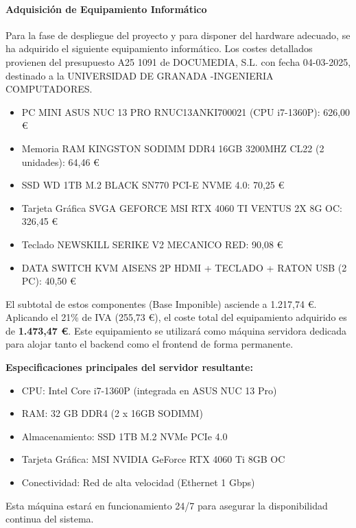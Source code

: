 \paragraph{Adquisición de Equipamiento Informático}
Para la fase de despliegue del proyecto y para disponer del hardware adecuado, se ha adquirido el siguiente equipamiento informático. Los costes detallados provienen del presupuesto A25 1091 de DOCUMEDIA, S.L. con fecha 04-03-2025, destinado a la UNIVERSIDAD DE GRANADA -INGENIERIA COMPUTADORES.
\begin{itemize}
    \item PC MINI ASUS NUC 13 PRO RNUC13ANKI700021 (CPU i7-1360P): 626,00 €
    \item Memoria RAM KINGSTON SODIMM DDR4 16GB 3200MHZ CL22 (2 unidades): 64,46 € 
    \item SSD WD 1TB M.2 BLACK SN770 PCI-E NVME 4.0: 70,25 € 
    \item Tarjeta Gráfica SVGA GEFORCE MSI RTX 4060 TI VENTUS 2X 8G OC: 326,45 € 
    \item Teclado NEWSKILL SERIKE V2 MECANICO RED: 90,08 € 
    \item DATA SWITCH KVM AISENS 2P HDMI + TECLADO + RATON USB (2 PC): 40,50 € 
\end{itemize}
El subtotal de estos componentes (Base Imponible) asciende a 1.217,74 €. Aplicando el 21\% de IVA (255,73 €), el coste total del equipamiento adquirido es de \textbf{1.473,47 €}. Este equipamiento se utilizará como máquina servidora dedicada para alojar tanto el backend como el frontend de forma permanente.

\textbf{Especificaciones principales del servidor resultante:}
\begin{itemize}
    \item CPU: Intel Core i7-1360P (integrada en ASUS NUC 13 Pro) 
    \item RAM: 32 GB DDR4 (2 x 16GB SODIMM) 
    \item Almacenamiento: SSD 1TB M.2 NVMe PCIe 4.0 
    \item Tarjeta Gráfica: MSI NVIDIA GeForce RTX 4060 Ti 8GB OC 
    \item Conectividad: Red de alta velocidad (Ethernet 1 Gbps)
\end{itemize}
Esta máquina estará en funcionamiento 24/7 para asegurar la disponibilidad continua del sistema.

